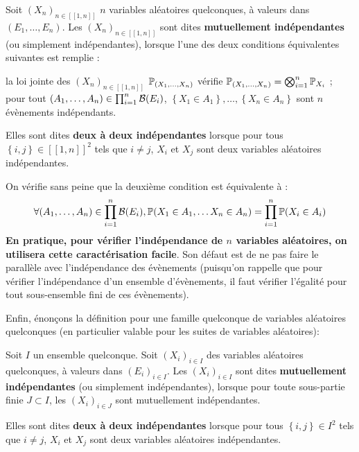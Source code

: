 \documentclass[../integ-proba.tex]{subfiles}
\begin{document}
    \begin{defi}
        Soit $\left( X_n \right)_{n \in [\![1,n]\!]}$ $n$ variables aléatoires quelconques, à valeurs dans $\left( E_1, \ldots, E_n \right)$.
        Les $\left( X_n \right)_{n \in [\![1,n]\!]}$ sont dites \textbf{mutuellement indépendantes} (ou simplement indépendantes), lorsque l'une des deux conditions équivalentes suivantes est remplie :
        \begin{itemize}
            \itemb la loi jointe des $\left( X_n \right)_{n \in [\![1,n]\!]}$ $\mathbb{P}_{(X_1, \ldots, X_n)}$ vérifie $\mathbb{P}_{(X_1, \ldots, X_n)} = \bigotimes_{i=1}^n \mathbb{P}_{X_i}$ ;
            \itemb pour tout $(A_1, \ldots, A_n) \in \prod_{i = 1}^n \mathcal{B}(E_i)$, $\left\{ X_1 \in A_1 \right\}, \ldots, \left\{ X_n \in A_n \right\}$ sont $n$ évènements indépendants.
        \end{itemize}
        Elles sont dites \textbf{deux à deux indépendantes} lorsque pour tous $\left\{ i,j \right\} \in [\![1,n]\!]^2$ tels que $i \neq j$, $X_i$ et $X_j$ sont deux variables aléatoires indépendantes.
    \end{defi}

    \begin{rem}
        On vérifie sans peine que la deuxième condition est équivalente à :
        \begin{displaymath}
            \forall (A_1, \ldots, A_n) \in \prod_{i = 1}^n \mathcal{B}(E_i), \mathbb{P}(X_1 \in A_1, \ldots X_n \in A_n) = \prod_{i = 1}^n \mathbb{P}(X_i \in A_i)
        \end{displaymath}
        \textbf{En pratique, pour vérifier l'indépendance de $n$ variables aléatoires, on utilisera cette caractérisation facile}.
        Son défaut est de ne pas faire le parallèle avec l'indépendance des évènements (puisqu'on rappelle que pour vérifier l'indépendance d'un ensemble d'évènements, il faut vérifier l'égalité pour tout sous-ensemble fini de ces évènements).
    \end{rem}

    Enfin, énonçons la définition pour une famille quelconque de variables aléatoires quelconques (en particulier valable pour les suites de variables aléatoires):
    \begin{defi}
        Soit $I$ un ensemble quelconque.
        Soit $\left( X_i \right)_{i \in I}$ des variables aléatoires quelconques, à valeurs dans $\left( E_i\right)_{i \in I}$.
        Les $\left( X_i \right)_{i \in I}$ sont dites \textbf{mutuellement indépendantes} (ou simplement indépendantes), lorsque pour toute sous-partie finie $J \subset I$, les $\left( X_i \right)_{i \in J}$ sont mutuellement indépendantes.

        Elles sont dites \textbf{deux à deux indépendantes} lorsque pour tous $\left\{ i,j \right\} \in I^2$ tels que $i \neq j$, $X_i$ et $X_j$ sont deux variables aléatoires indépendantes.
    \end{defi}
\end{document}
